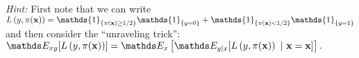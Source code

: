 \documentclass[a4paper]{article}
\begin{document}
{\begin{enumerate}
\emph{Hint:} First note that we can write $\Lpixy = \mathds{1}_{\{ \pix\geq 1/2  \}}  \mathds{1}_{\{ y=0 \}} + \mathds{1}_{\{ \pix< 1/2  \}} \mathds{1}_{\{ y=1 \}}  $ and then consider the ``unraveling trick'': $  \E_{xy}[\Lpixy ]  = \E_x \left[\E_{y|x}[\Lpixy ~|~ \xv =\xv ] \right]. $ 

\end{enumerate}
  
}
\end{document}

